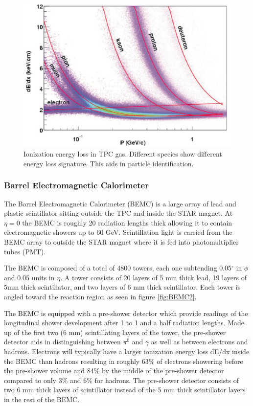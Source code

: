 \documentclass[abstract = on,listof=totoc, bibliography=totoc]{scrreprt}
\begin{document}
\begin{figure}
\begin{center}
\includegraphics[width = 1\textwidth]{tpc_dEdx}
\caption[Ionization energy loss in TPC gas]{Ionization energy loss in TPC gas. Different species show different energy loss signature. This aids in particle identification.}
\label{fig:tpc_dEdx}
\end{center}
\end{figure}

\FloatBarrier
\subsubsection[BEMC]{Barrel Electromagnetic Calorimeter}

The Barrel Electromagnetic Calorimeter (BEMC) is a large array of lead and plastic scintillator sitting outside the TPC and inside the STAR magnet. At $\eta = 0$ the BEMC is roughly 20 radiation lengths thick allowing it to contain electromagnetic showers up to 60 GeV. Scintillation light is carried from the BEMC array to outside the STAR magnet where it is fed into photomultiplier tubes (PMT).

The BEMC is composed of a total of 4800 towers, each one subtending 0.05$^\circ$ in $\phi$ and 0.05 units in $\eta$. A tower consists of 20 layers of 5 mm thick lead, 19 layers of 5mm thick scintillator, and two layers of 6 mm thick scintillator. Each tower is angled toward the reaction region as seen in figure \ref{fig:BEMC2}.  

The BEMC is equipped with a pre-shower detector which provide readings of the longitudinal shower development after 1 to 1 and a half radiation lengths. Made up of the first two (6 mm) scintillating layers of the tower, the pre-shower detector aids in distinguishing between $\pi^0$ and $\gamma$ as well as between electrons and hadrons. Electrons will typically have a larger ionization energy loss dE/dx inside the BEMC than hadrons resulting in roughly 63\% of electrons showering before the pre-shower volume and 84\% by the middle of the pre-shower detector compared to only 3\% and 6\% for hadrons. The pre-shower detector consists of two 6 mm thick layers of scintillator instead of the 5 mm thick scintillator layers in the rest of the BEMC. 
\end{document}

